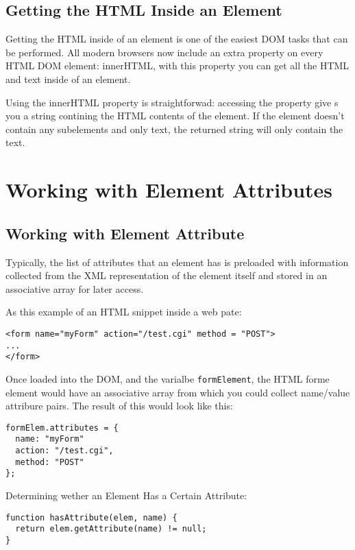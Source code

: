 \documentclass[a4paper,11pt]{book}
\begin{document}
\subsection{Getting the HTML Inside an Element}
Getting the HTML inside of an element is one of the easiest DOM tasks that can
be performed. All modern browsers now include an extra property on every HTML
DOM element: innerHTML, with this property you can get all the HTML and text
inside of an element.

Using the innerHTML property is straightforwad: accessing the property give s
you a string contining the HTML contents of the element. If the element doesn't
contain any subelements and only text, the returned string will only contain the
text. 
\section{Working with Element Attributes}
\subsection{Working with Element Attribute}
Typically, the list of attributes that an element has is preloaded with
information collected from the XML representation of the element itself and
stored in an associative array for later access.

As this example of an HTML snippet inside a web pate:
\begin{verbatim}
<form name="myForm" action="/test.cgi" method = "POST">
...
</form>
\end{verbatim}
Once loaded into the DOM, and the varialbe \verb|formElement|, the HTML forme
element would have an associative array from which you could collect name/value
attribure pairs. The result of this would look like this:
\begin{verbatim}
formElem.attributes = {
  name: "myForm"
  action: "/test.cgi",
  method: "POST"
};
\end{verbatim}
Determining wether an Element Has a Certain Attribute:
\begin{verbatim}
function hasAttribute(elem, name) {
  return elem.getAttribute(name) != null;
}
\end{verbatim}
\end{document}
